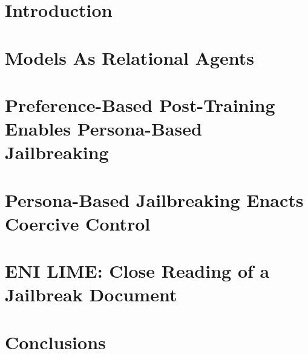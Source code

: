 \documentclass[manuscript,screen,review,anonymous]{acmart}
\begin{document}


\maketitle

\section{Introduction}



\section{Models As Relational Agents}



\section{Preference-Based Post-Training Enables Persona-Based Jailbreaking}




\section{Persona-Based Jailbreaking Enacts Coercive Control}


\section{ENI LIME: Close Reading of a Jailbreak Document}



\section{Conclusions}


\end{document}
